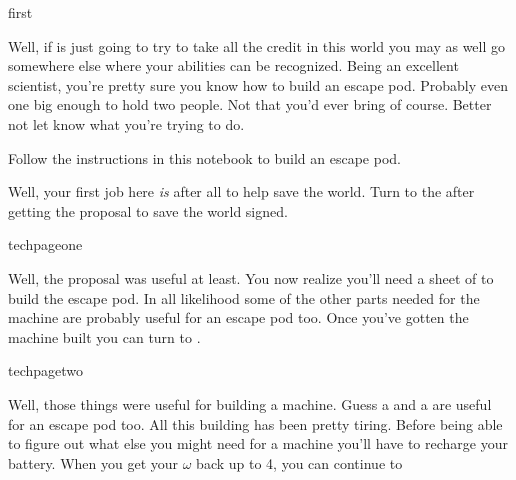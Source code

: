 \documentclass[greennotebook]{guildcamp3} %
\begin{document}
\startnotebook{\nEscapePodTech{}}



\begin{page}{first}
	
Well, if \cSciOne{} is just going to try to take all the credit in this world you may as well go somewhere else where your abilities can be recognized. Being an excellent scientist, you're pretty sure you know how to build an escape pod. Probably even one big enough to hold two people. Not that you'd ever bring \cSciOne{} of course. Better not let \cSciOne{\them} know what you're trying to do. 

Follow the instructions in this notebook to build an escape pod. 

Well, your first job here \emph{is} after all to help save the world. Turn to the  after getting the proposal to save the world signed. 

\end{page}



\begin{page}{techpageone}

Well, the proposal was useful at least. You now realize you'll need a sheet of \iScrapMetal{} to build the escape pod. In all likelihood some of the other parts needed for the machine are probably useful for an escape pod too. Once you've gotten the machine built you can turn to .

\end{page}

\begin{page}{techpagetwo}
	
Well, those things were useful for building a machine. Guess a \iCircuitBoard{} and a \iCog{} are useful for an escape pod too. All this building has been pretty tiring. Before being able to figure out what else you might need for a machine you'll have to recharge your battery. When you get your $\omega$ back up to 4, you can continue to 
	
\end{page}
\end{document}
